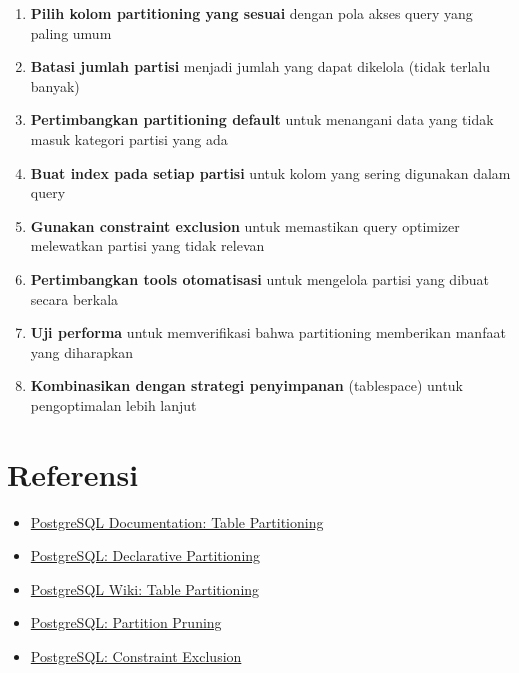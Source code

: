 \begin{enumerate}
    \item \textbf{Pilih kolom partitioning yang sesuai} dengan pola akses query yang paling umum
    \item \textbf{Batasi jumlah partisi} menjadi jumlah yang dapat dikelola (tidak terlalu banyak)
    \item \textbf{Pertimbangkan partitioning default} untuk menangani data yang tidak masuk kategori partisi yang ada
    \item \textbf{Buat index pada setiap partisi} untuk kolom yang sering digunakan dalam query
    \item \textbf{Gunakan constraint exclusion} untuk memastikan query optimizer melewatkan partisi yang tidak relevan
    \item \textbf{Pertimbangkan tools otomatisasi} untuk mengelola partisi yang dibuat secara berkala
    \item \textbf{Uji performa} untuk memverifikasi bahwa partitioning memberikan manfaat yang diharapkan
    \item \textbf{Kombinasikan dengan strategi penyimpanan} (tablespace) untuk pengoptimalan lebih lanjut
\end{enumerate}
\section{Referensi}

\begin{itemize}
    \item \href{https://www.postgresql.org/docs/current/ddl-partitioning.html}{PostgreSQL Documentation: Table Partitioning}
    \item \href{https://www.postgresql.org/docs/current/ddl-partitioning.html#DDL-PARTITIONING-DECLARATIVE}{PostgreSQL: Declarative Partitioning}
    \item \href{https://wiki.postgresql.org/wiki/Table_partitioning}{PostgreSQL Wiki: Table Partitioning}
    \item \href{https://www.postgresql.org/docs/current/ddl-partitioning.html#DDL-PARTITIONING-IMPLEMENTATION}{PostgreSQL: Partition Pruning}
    \item \href{https://www.postgresql.org/docs/current/ddl-partitioning.html#DDL-PARTITIONING-CONSTRAINT-EXCLUSION}{PostgreSQL: Constraint Exclusion}
\end{itemize}

